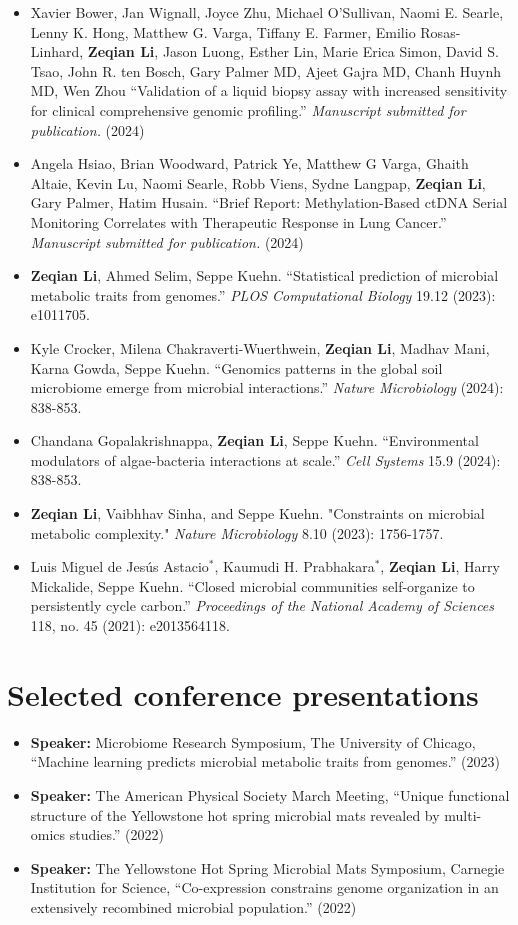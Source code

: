 \documentclass[letterpaper,11pt]{article}
\newcommand{\resumeSubHeadingListStart}{\begin{itemize}[leftmargin=0in]}
\newcommand{\resumeSubHeadingListEnd}{\end{itemize}}
\begin{document}
 \resumeSubHeadingListStart
     \item[] Xavier Bower, Jan Wignall, Joyce Zhu, Michael O’Sullivan, Naomi E. Searle, Lenny K. Hong, Matthew G. Varga, Tiffany E. Farmer, Emilio Rosas-Linhard, \textbf{Zeqian Li}, Jason Luong, Esther Lin, Marie Erica Simon, David S. Tsao, John R. ten Bosch, Gary Palmer MD, Ajeet Gajra MD, Chanh Huynh MD, Wen Zhou ``Validation of a liquid biopsy assay with increased sensitivity for clinical comprehensive genomic profiling.''  \textit{Manuscript submitted for publication.} (2024)
     \item[] Angela Hsiao, Brian Woodward, Patrick Ye, Matthew G Varga, Ghaith Altaie, Kevin Lu, Naomi Searle, Robb Viens, Sydne Langpap, \textbf{Zeqian Li}, Gary Palmer, Hatim Husain. ``Brief Report: Methylation-Based ctDNA Serial Monitoring Correlates with Therapeutic Response in Lung Cancer.''  \textit{Manuscript submitted for publication.} (2024)
     \item[] \textbf{Zeqian Li}, Ahmed Selim, Seppe Kuehn. ``Statistical prediction of microbial metabolic traits from genomes.''  \textit{PLOS Computational Biology} 19.12 (2023): e1011705.
     \item[] Kyle Crocker, Milena Chakraverti-Wuerthwein, \textbf{Zeqian Li}, Madhav Mani, Karna Gowda, Seppe Kuehn. ``Genomics patterns in the global soil microbiome emerge from microbial interactions.'' \textit{Nature Microbiology} (2024): 838-853.
     \item[] Chandana Gopalakrishnappa, \textbf{Zeqian Li}, Seppe Kuehn. ``Environmental modulators of algae-bacteria interactions at scale.'' \textit{Cell Systems} 15.9 (2024): 838-853.
     \item[] \textbf{Zeqian Li}, Vaibhhav Sinha, and Seppe Kuehn. "Constraints on microbial metabolic complexity." \textit{Nature Microbiology} 8.10 (2023): 1756-1757.
     \item[] Luis Miguel de Jesús Astacio$^*$, Kaumudi H. Prabhakara$^*$, \textbf{Zeqian Li}, Harry Mickalide, Seppe Kuehn. ``Closed microbial communities self-organize to persistently cycle carbon.''  \textit{Proceedings of the National Academy of Sciences} 118, no. 45 (2021): e2013564118. 
 \resumeSubHeadingListEnd

\section{Selected conference presentations}
\resumeSubHeadingListStart
     \item[] \textbf{Speaker:} Microbiome Research Symposium, The University of Chicago, ``Machine learning predicts microbial metabolic traits from genomes.''  (2023)
     \item[] \textbf{Speaker:} The American Physical Society March Meeting, ``Unique functional structure of the Yellowstone hot spring microbial mats revealed by multi-omics studies.''  (2022)
     \item[] \textbf{Speaker:} The Yellowstone Hot Spring Microbial Mats Symposium, Carnegie Institution for Science, ``Co-expression constrains genome organization in an extensively recombined microbial population.''  (2022)
     

     
 \resumeSubHeadingListEnd



\end{document}
